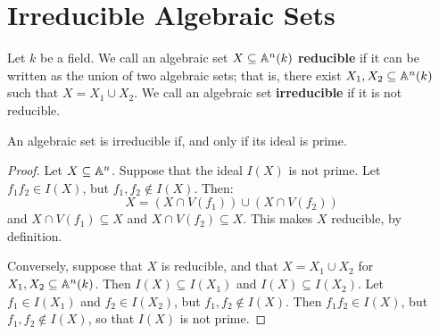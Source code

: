 \section{Irreducible Algebraic Sets}\label{section_10.3}

\begin{definition}
  Let $k$ be a field. We call an algebraic set $X \subseteq \mathbb{A}^n(k)$
  \textbf{reducible} if it can be written as the union of two algebraic sets;
  that is, there exist $X_1,X_2 \subseteq \mathbb{A}^n(k)$ such that $X=X_1 \cup X_2$.
  We call an algebraic set \textbf{irreducible} if it is not reducible.
\end{definition}

\begin{proposition}\label{proposition_10.3.1}
  An algebraic set is irreducible if, and only if its ideal is prime.
\end{proposition}
\begin{proof}
  Let $X \subseteq \mathbb{A}^n$. Suppose that the ideal $I(X)$ is not prime.
  Let $f_1f_2 \in I(X)$, but $f_1,f_2 \not\in I(X)$. Then:
  \begin{equation*}
    X=(X \cap V(f_1)) \cup (X \cap V(f_2))
  \end{equation*}
  and $X \cap V(f_1) \subseteq X$ and $X \cap V(f_2) \subseteq X$. This makes
  $X$ reducible, by definition.

  Conversely, suppose that $X$ is reducible, and that $X=X_1 \cup X_2$ for
  $X_1, X_2 \subseteq \mathbb{A}^n(k)$. Then $I(X) \subseteq I(X_1)$ and $I(X)
  \subseteq I(X_2)$. Let $f_1 \in I(X_1)$ and $f_2 \in I(X_2)$, but $f_1,f_2
  \not\in I(X)$. Then $f_1f_2 \in I(X)$, but $f_1,f_2 \not\in I(X)$, so that
  $I(X)$ is not prime.
\end{proof}

